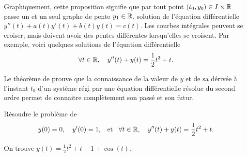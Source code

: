 \documentclass{magnolia}
\begin{document}
\begin{remarques}
\remarque Graphiquement, cette proposition signifie que par tout
  point $(t_0,y_0)\in I\times \mathbb{R}$ passe un et un seul graphe de pente $y_1\in\mathbb{R}$,
  solution de l'équation différentielle $y''(t)+a(t)y'(t)+b(t)y(t)=c(t)$. Les courbes intégrales peuvent se croiser, mais doivent avoir des pentes différentes lorsqu'elles se croisent. Par exemple, voici quelques
  solutions de l'équation différentielle
  \[\forall t\in\mathbb{R},\quad y''(t)+y(t)=\frac{1}{2}t^2+t.\]
\begin{center}
\end{center}
\remarque Le théorème de  prouve que la connaissance de la valeur de $y$ et de sa dérivée à l'instant $t_0$ d'un système régi par une équation différentielle résolue du second ordre permet de connaitre complètement son passé et son futur.
\end{remarques}
\vspace{2ex}
\begin{exoUnique}
\exo Résoudre le problème de 
  \[y(0)=0,\quad y'(0)=1,\quad\!\text{et}\quad\! \forall t\in\mathbb{R},\quad y''(t)+y(t)=\frac{1}{2}t^2+t.\]
\begin{sol}
On trouve $y(t)=\frac{1}{2}t^2+t-1+\cos(t)$.
\end{sol}
\end{exoUnique}
\end{document}
